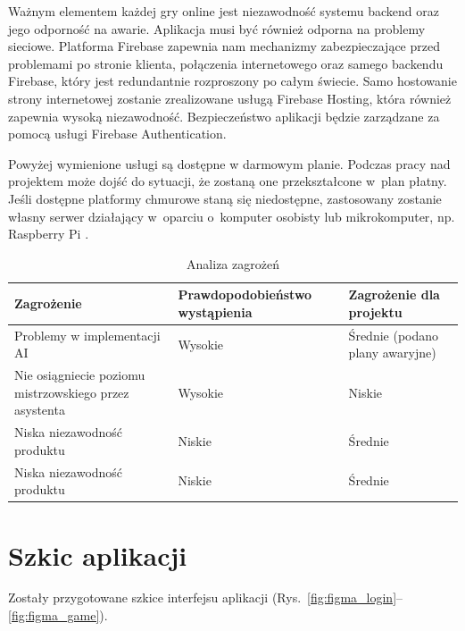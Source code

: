 Ważnym elementem każdej gry online jest niezawodność systemu
backend oraz jego odporność na awarie.
Aplikacja musi być również odporna na problemy sieciowe.
Platforma Firebase zapewnia nam mechanizmy zabezpieczające
przed problemami po stronie klienta, połączenia internetowego
oraz samego backendu Firebase, który jest redundantnie
rozproszony po całym świecie.
Samo hostowanie strony internetowej zostanie zrealizowane
usługą Firebase Hosting, która również zapewnia wysoką
niezawodność.
Bezpieczeństwo aplikacji będzie zarządzane za pomocą
usługi Firebase Authentication.

Powyżej wymienione usługi są dostępne w darmowym planie.
Podczas pracy nad projektem może dojść do sytuacji, że
zostaną one przekształcone w~plan płatny.
Jeśli dostępne platformy chmurowe staną się niedostępne,
zastosowany zostanie własny serwer działający
w~oparciu o~komputer osobisty lub mikrokomputer, np. Raspberry Pi \cite{RPi}.

\begin{table}[h]
  \centering
  \begin{tabularx}{\textwidth}{|p{5.5cm}|Y|Y|}
    \hline
    \textbf{Zagrożenie}                                    & \textbf{Prawdopodobieństwo wystąpienia} & \textbf{Zagrożenie dla projektu} \tabularnewline[0.2cm]
    \hline
    Problemy w implementacji AI                            & Wysokie                                 & Średnie (podano plany awaryjne)  \tabularnewline[0.2cm]
    Nie osiągniecie poziomu mistrzowskiego przez asystenta & Wysokie                                 & Niskie                           \tabularnewline[0.3cm]
    Niska niezawodność produktu                            & Niskie                                  & Średnie                          \tabularnewline[0.1cm]
    Niska niezawodność produktu                            & Niskie                                  & Średnie                          \tabularnewline[0.1cm]
    \hline
  \end{tabularx}
  \caption{Analiza zagrożeń}
  \label{tab:zagrozenia}
\end{table}


\newpage

\section{Szkic aplikacji}

Zostały przygotowane szkice interfejsu aplikacji
(Rys.~\ref{fig:figma_login}--\ref{fig:figma_game}).

